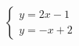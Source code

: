$\displaystyle
\left\{
\begin{array}{l}
\displaystyle y = 2x - 1 \\
\displaystyle y = - x + 2
\end{array}
\right.
$
